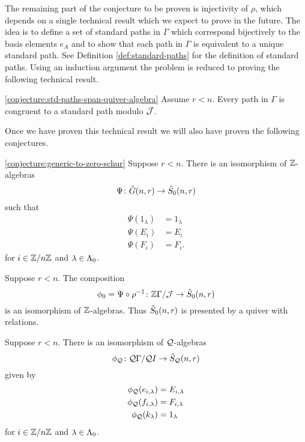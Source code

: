 \documentclass[a4paper, 11pt, twoside]{report}
\begin{document}
The remaining part of the conjecture to be proven is injectivity of $\rho$, which depends on a single technical result which we expect to prove in the future. The idea is to define a set of standard paths in $\Gamma$ which correspond bijectively to the basis elements $e_A$ and to show that each path in $\Gamma$ is equivalent to a unique standard path. See Definition \ref{def:standard-paths} for the definition of standard paths. Using an induction argument the problem is reduced to proving the following technical result.

\begin{conjecture*}\ref{conjecture:std-paths-span-quiver-algebra}
Assume $r<n$. Every path in $\Gamma$ is congruent to a standard path modulo $\mathcal{J}$.
\end{conjecture*}

Once we have proven this technical result we will also have proven the following conjectures.

\begin{conjecture*}\ref{conjecture:generic-to-zero-schur}
Suppose $r<n$. There is an isomorphism of $\mathbb{Z}$-algebras
\begin{equation*}
\Psi\colon\hat{G}(n,r)\to\hat{S}_0(n,r)
\end{equation*}
such that
\begin{align*}
\Psi(1_\lambda) &= 1_\lambda\\
\Psi(E_i) &= E_i\\
\Psi(F_i) &= F_i.
\end{align*}
for $i\in\mathbb{Z}/{n \mathbb{Z}}$ and $\lambda\in\Lambda_0{}$.
\end{conjecture*}

\begin{conjecture*}
Suppose $r<n$. The composition
\begin{equation*}
\phi_0=\Psi\circ\rho^{-1}\colon\mathbb{Z}\Gamma/{\mathcal{J}}\to\hat{S}_0(n,r)
\end{equation*}
is an isomorphism of $\mathbb{Z}$-algebras. Thus $\hat{S}_0(n,r)$ is presented by a quiver with relations.
\end{conjecture*}

\begin{conjecture*}
Suppose $r<n$. There is an isomorphism of $\mathcal{Q}$-algebras
\begin{equation*}
\phi_{\mathcal{Q}}\colon \mathcal{Q}\Gamma/{\mathcal{Q}I}\to\hat{S}_{\mathcal{Q}}(n,r)
\end{equation*}
given by
\begin{align*}
\phi_{\mathcal{Q}}(e_{i,\lambda}) &= E_{i,\lambda}\\
\phi_{\mathcal{Q}}(f_{i,\lambda}) &= F_{i,\lambda}\\
\phi_{\mathcal{Q}}(k_\lambda) &= 1_\lambda
\end{align*}
for $i\in\mathbb{Z}/{n \mathbb{Z}}$ and $\lambda\in\Lambda_0{}$.
\end{conjecture*}
\end{document}
